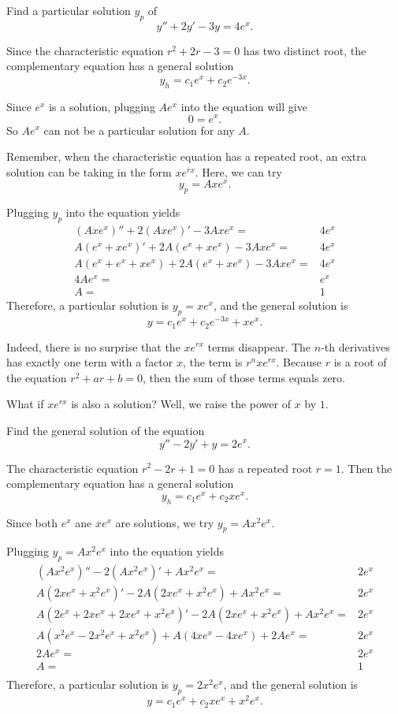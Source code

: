 \begin{example}
Find a particular solution $y_p$ of 
\[  y'' + 2 y' - 3 y = 4e^x.\]
\end{example}
\begin{solution}
  Since the characteristic equation $r^2+2r-3=0$ has two distinct root, the complementary equation has a general solution
  \[y_h=c_1e^x+c_2e^{-3x}.\]

  Since $e^x$ is a solution, plugging $Ae^x$ into the equation will give
  \[0=e^x.\]
  So $Ae^x$ can not be a particular solution for any $A$.

  Remember, when the characteristic equation has a repeated root, an extra solution can be taking in the form $xe^{rx}$. Here, we can try
  \[y_p=Axe^x.\]

  Plugging $y_p$ into the equation yields
  \[
  \begin{aligned}
    (Axe^x)''+2(Axe^x)'-3Axe^x=&4e^x\\
    A(e^x+xe^x)'+2A(e^x+xe^x)-3Axe^x=&4e^x\\
    A(e^x+e^x+xe^x)+2A(e^x+xe^x)-3Axe^x=&4e^x\\
    4Ae^x=&e^x\\
    A=&1
  \end{aligned}  
  \]
  Therefore, a particular solution is $y_p=xe^x$, and the general solution is
  \[y=c_1e^x+c_2e^{-3x}+xe^x.\]
\end{solution}

Indeed, there is no surprise that the $xe^{rx}$ terms disappear. The $n$-th derivatives has exactly one term with a factor $x$, the term is $r^nxe^{rx}$. Because $r$ is a root of the equation $r^2+ar+b=0$, then the sum of those terms equals zero.

What if $xe^{rx}$ is also a solution? Well, we raise the power of $x$ by $1$.

\begin{example}
  Find the general solution of the equation
  \[y''-2y'+y=2e^x.\]
\end{example}
\begin{solution}
  The characteristic equation $r^2-2r+1=0$ has a repeated root $r=1$. Then the complementary equation has a general solution
  \[y_h=c_1e^x+c_2xe^x.\]

  Since both $e^x$ ane $xe^x$ are solutions, we try $y_p=Ax^2e^x$.

  Plugging $y_p=Ax^2e^x$ into the equation yields
  \[
  \begin{aligned}
    (Ax^2e^x)''-2(Ax^2e^x)'+Ax^2e^x=&2e^x\\
    A(2xe^x+x^2e^x)'-2A(2xe^x+x^2e^x)+Ax^2e^x=&2e^x\\
    A(2e^x+2xe^x+2xe^x+x^2e^x)'-2A(2xe^x+x^2e^x)+Ax^2e^x=&2e^x\\
    A(x^2e^x-2x^2e^x+x^2e^x)+A(4xe^x-4xe^x)+2Ae^x=&2e^x\\
    2Ae^x=&2e^x\\
    A=&1\\
  \end{aligned}  
  \]
  Therefore, a particular solution is $y_p=2x^2e^x$, and the general solution is
  \[y=c_1e^x+c_2xe^x+x^2e^x.\]
\end{solution}

